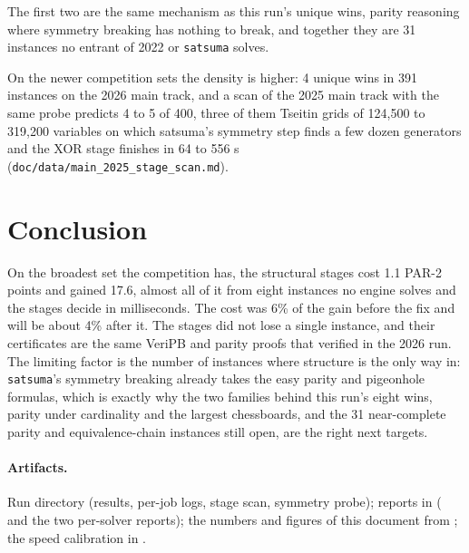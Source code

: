 \documentclass[10pt]{article}
\newcommand{\sats}{\texttt{satsuma}}
\newcommand{\partwo}{PAR-2}
\begin{document}
The first two are the same mechanism as this run's unique wins, parity
reasoning where symmetry breaking has nothing to break, and together they
are 31 instances no entrant of 2022 or \sats{} solves.

On the newer competition sets the density is higher: 4 unique wins in 391
instances on the 2026 main track, and a scan of the 2025 main track with
the same probe predicts 4 to 5 of 400, three of them Tseitin grids of
124,500 to 319,200 variables on which satsuma's symmetry step finds a few
dozen generators and the XOR stage finishes in 64 to 556 s
(\texttt{doc/data/main\_2025\_stage\_scan.md}).

\section{Conclusion}

On the broadest set the competition has, the structural stages cost
1.1 \partwo{} points and gained 17.6, almost all of it from eight
instances no engine solves and the stages decide in milliseconds. The
cost was 6\% of the gain before the fix and will be about 4\% after it.
The stages did not lose a single instance, and their
certificates are the same VeriPB and parity proofs that verified in the
2026 run. The limiting factor is the number of instances where structure
is the only way in: \sats{}'s symmetry breaking already takes the easy
parity and pigeonhole formulas, which is exactly why the two families
behind this run's eight wins, parity under cardinality and the largest
chessboards, and the 31 near-complete parity and equivalence-chain
instances still open, are the right next targets.

\paragraph{Artifacts.} Run directory
 (results, per-job logs, stage
scan, symmetry probe); reports in 
( and the two
per-solver reports); the numbers and figures of this document from
; the speed
calibration in .
\end{document}
